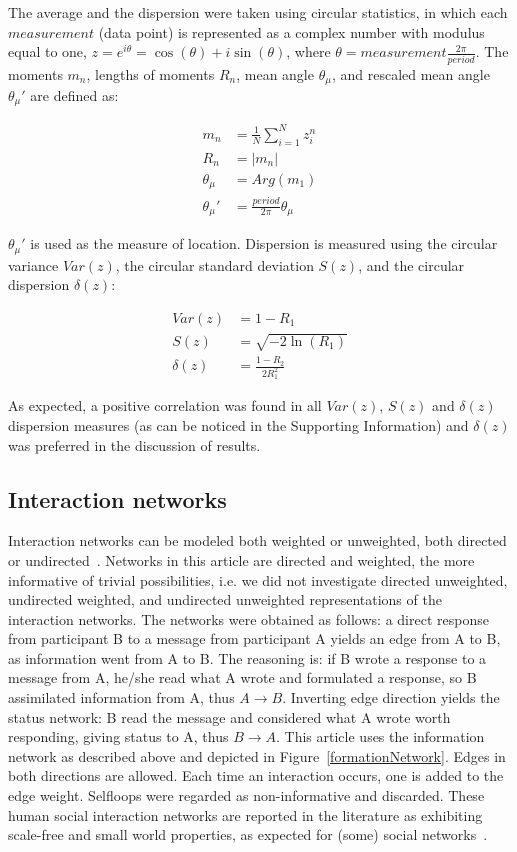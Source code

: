 \documentclass[%
	aip,
	jmp,%
	amsmath,amssymb,
	reprint,%
]{revtex4-1}
\begin{document}
The average and the dispersion were taken using circular statistics, in which each $measurement$ (data point) is represented as a complex number with modulus equal to one, $z=e^{i\theta}=\cos(\theta)+i\sin(\theta)$, where $\theta=measurement\frac{2\pi}{period}$. The moments $m_n$, lengths of moments $R_n$, mean angle $\theta_\mu$, and rescaled mean angle $\theta_\mu'$ are defined as:

\begin{align}\label{eq:cmom}
	m_n&=\frac{1}{N}\sum_{i=1}^N z_i^n \nonumber\\
	R_n&=|m_n|\\
	\theta_\mu&=Arg(m_1) \nonumber \\
	\theta_\mu'&=\frac{period}{2\pi} \theta_\mu \nonumber
\end{align}

$\theta_\mu'$ is used as the measure of location. Dispersion is measured using the circular variance $Var(z)$, the circular standard deviation $S(z)$, and the circular dispersion $\delta(z)$:

\begin{align}\label{eq:cmd}
	Var(z)&=1 - R_1 \nonumber\\
	S(z)&= \sqrt{-2\ln(R_1)}\\
	\delta(z)&=\frac{1-R_2}{2 R_1^2} \nonumber
\end{align}

As expected, a positive correlation was found in all $Var(z)$, $S(z)$ and $\delta(z)$ dispersion measures (as can be noticed in the Supporting Information) and $\delta(z)$ was preferred in the discussion of results.

\subsection{Interaction networks}\label{intNet}
Interaction networks can be modeled both weighted or unweighted, both directed or undirected~\cite{bird,newmanCommunityDirected,newmanCommunity2013}.
Networks in this article are directed and weighted, the more informative of trivial possibilities, i.e. we did not investigate directed unweighted, undirected weighted, and undirected unweighted representations of the interaction networks. 
The networks were obtained as follows: a direct response from participant B to a message from participant A yields an edge from A to B, as information went from A to B. The reasoning is: if B wrote a response to a message from A, he/she read what A wrote and formulated a response, so B assimilated information from A, thus $A \rightarrow B$. Inverting edge direction yields the status network: B read the message and considered what A wrote worth responding, giving status to A, thus $B\rightarrow A$. This article uses the information network as described above and depicted in Figure~\ref{formationNetwork}. Edges in both directions are allowed. Each time an interaction occurs, one is added to the edge weight. Selfloops were regarded as non-informative and discarded. These human social interaction networks are reported in the literature as exhibiting scale-free and small world properties, as expected for (some) social networks~\cite{bird,newmanBook}.
\end{document}
